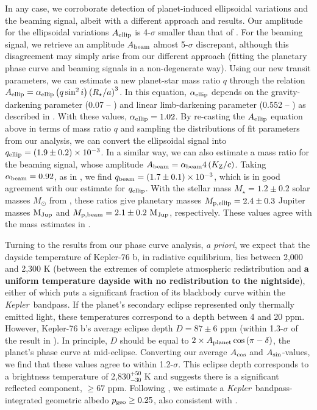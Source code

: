 \documentclass[manuscript]{aastex62}
\newcommand{\kepler}{{\it Kepler}}
\begin{document}
In any case, we corroborate detection of planet-induced ellipsoidal variations and the beaming signal, albeit with a different approach and results. Our amplitude for the ellipsoidal variations $A_{\rm ellip}$ is 4-$\sigma$ smaller than that of \citet{2013ApJ...771...26F}. For the beaming signal, we retrieve an amplitude $A_{\rm beam}$ almost 5-$\sigma$ discrepant, although this disagreement may simply arise from our different approach (fitting the planetary phase curve and beaming signals in a non-degenerate way). Using our new transit parameters, we can estimate a new planet-star mass ratio $q$ through the relation $A_{\rm ellip} = \alpha_{\rm ellip} \left( q \sin^2 i \right) \left( R_\star / a \right)^{3}$. In this equation, $\alpha_{\rm ellip}$ depends on the gravity-darkening parameter (0.07 -- \citealp{2011AA...529A..75C}) and linear limb-darkening parameter (0.552 -- \citealp{2015MNRAS.450.1879E}) as described in \citet{1985ApJ...295..143M}. With these values, $\alpha_{\rm ellip} = 1.02$. By re-casting the $A_{\rm ellip}$ equation above in terms of mass ratio $q$ and sampling the distributions of fit parameters from our analysis, we can convert the ellipsoidal signal into $q_{\rm ellip} = \left( 1.9 \pm 0.2 \right) \times 10^{-3}$. In a similar way, we can also estimate a mass ratio for the beaming signal, whose amplitude $A_{\rm beam} = \alpha_{\rm beam} 4 \left( K_{\rm Z} / c \right)$. Taking $\alpha_{\rm beam} = 0.92$, as in \citet{2013ApJ...771...26F}, we find $q_{\rm beam} = \left( 1.7\pm 0.1 \right) \times 10^{-3}$, which is in good agreement with our estimate for $q_{\rm ellip}$. With the stellar mass $M_\star = 1.2 \pm 0.2$ solar masses $M_{\odot}$ from \citet{2013ApJ...771...26F}, these ratios give planetary masses $M_{\rm p, ellip} = 2.4 \pm 0.3$ Jupiter masses ${\rm M_{Jup}}$ and $M_{\rm p, beam} = 2.1 \pm 0.2\ {\rm M_{Jup}}$, respectively. These values agree with the mass estimates in \citet{2013ApJ...771...26F}.

Turning to the results from our phase curve analysis, \emph{a priori}, we expect that the dayside temperature of Kepler-76 b, in radiative equilibrium, lies between 2,000 and 2,300 K (between the extremes of complete atmospheric redistribution and \textbf{a uniform temperature dayside with no redistribution to the nightside}), either of which puts a significant fraction of its blackbody curve within the \kepler\ bandpass. If the planet's secondary eclipse represented only thermally emitted light, these temperatures correspond to a depth between 4 and 20 ppm. However, Kepler-76 b's average eclipse depth $D = 87 \pm 6$ ppm (within 1.3-$\sigma$ of the result in  \citealt{2013ApJ...771...26F}). In principle, $D$ should be equal to $2\times A_{\rm planet} \cos \left( \pi - \delta \right)$, the planet's phase curve at mid-eclipse. Converting our average $A_{\rm cos}$ and $A_{\rm sin}$-values, we find that these values agree to within 1.2-$\sigma$. This eclipse depth corresponds to a brightness temperature of 2,830$^{+50}_{-30}$ K and suggests there is a significant reflected component, $\geq 67$ ppm. Following \citet{2011MNRAS.415.3921F}, we estimate a \kepler\ bandpass-integrated geometric albedo $p_{\rm geo} \geq 0.25$, also consistent with \citet{2013ApJ...771...26F}.
\end{document}
